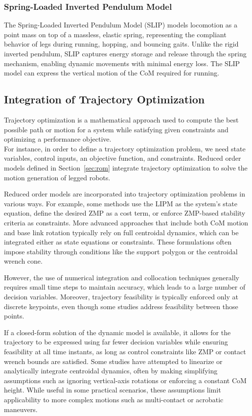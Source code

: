 \documentclass[main.tex]{subfiles}
\begin{document}
\subsubsection{Spring-Loaded Inverted Pendulum Model}
The Spring-Loaded Inverted Pendulum Model (SLIP) \cite{SLIP} models locomotion as a point mass on top of a massless, elastic spring, representing the compliant behavior of legs during running, hopping, and bouncing gaits. Unlike the rigid inverted pendulum, SLIP captures energy storage and release through the spring mechanism, enabling dynamic movements with minimal energy loss.
The SLIP model can express the vertical motion of the CoM required for running.

\subsection{Integration of Trajectory Optimization}

Trajectory optimization is a mathematical approach used to compute the best possible path or motion for a system while satisfying given constraints and optimizing a performance objective.
\\For instance, in order to define a trajectory optimization problem, we need state variables, control inputs, an objective function, and constraints.
Reduced order models defined in Section~\ref{sec:rom} integrate trajectory optimization to solve the motion generation of legged robots.

Reduced order models are incorporated into trajectory optimization problems in various ways. For example, some methods use the LIPM as the system's state equation, define the desired ZMP as a cost term, or enforce ZMP-based stability criteria as constraints. More advanced approaches that include both CoM motion and base link rotation typically rely on full centroidal dynamics, which can be integrated either as state equations or constraints. These formulations often impose stability through conditions like the support polygon or the centroidal wrench cone.

However, the use of numerical integration and collocation techniques generally requires small time steps to maintain accuracy, which leads to a large number of decision variables. Moreover, trajectory feasibility is typically enforced only at discrete keypoints, even though some studies address feasibility between those points.

If a closed-form solution of the dynamic model is available, it allows for the trajectory to be expressed using far fewer decision variables while ensuring feasibility at all time instants, as long as control constraints like ZMP or contact wrench bounds are satisfied. Some studies have attempted to linearize or analytically integrate centroidal dynamics, often by making simplifying assumptions such as ignoring vertical-axis rotations or enforcing a constant CoM height. While useful in some practical scenarios, these assumptions limit applicability to more complex motions such as multi-contact or acrobatic maneuvers.
\end{document}

